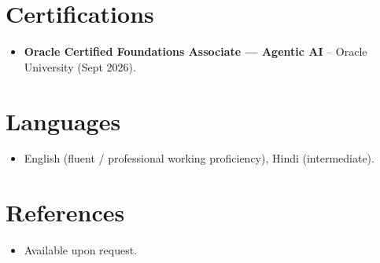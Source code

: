 \documentclass[11pt,a4paper,sans]{moderncv}
\begin{document}

\section{Certifications}
\vspace{1pt}
\begin{itemize}
\item{\textbf{Oracle Certified Foundations Associate --- Agentic AI} -- Oracle University (Sept 2026).}
\end{itemize}


\section{Languages}
\vspace{1pt}
\begin{itemize}
\item {English (fluent / professional working proficiency), Hindi (intermediate).}
\end{itemize}


\section{References}
\vspace{1pt}
\begin{itemize}
\item{Available upon request.}
\end{itemize}
\end{document}
